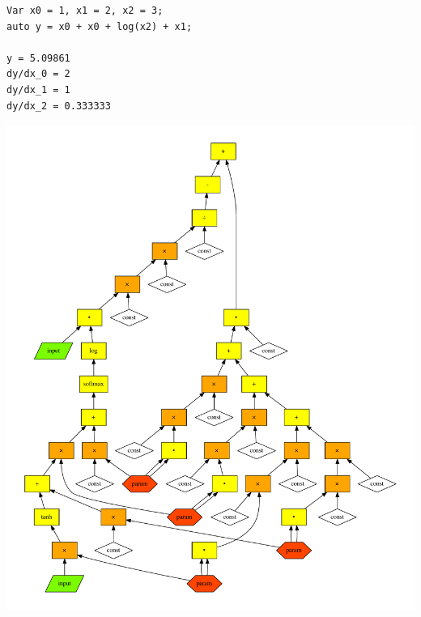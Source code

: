 \documentclass[aspectratio=169]{beamer}					%
\begin{document}
\begin{frame}[fragile]
\begin{lstlisting}
Var x0 = 1, x1 = 2, x2 = 3;
auto y = x0 + x0 + log(x2) + x1;

y = 5.09861
dy/dx_0 = 2
dy/dx_1 = 1
dy/dx_2 = 0.333333
\end{lstlisting}
\end{frame}

{

}

{

}

\begin{frame}{}\centering
\includegraphics[height=0.9\textheight]{cg1}
\end{frame}

\end{document}
